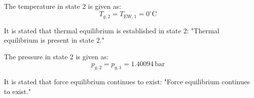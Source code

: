 The temperature in state 2 is given as:  
\[
T_{g,2} = T_{\text{EW},1} = 0^\circ\text{C}
\]

It is stated that thermal equilibrium is established in state 2:  
"Thermal equilibrium is present in state 2."

The pressure in state 2 is given as:  
\[
p_{g,2} = p_{g,1} = 1.40094 \, \text{bar}
\]

It is stated that force equilibrium continues to exist:  
"Force equilibrium continues to exist."